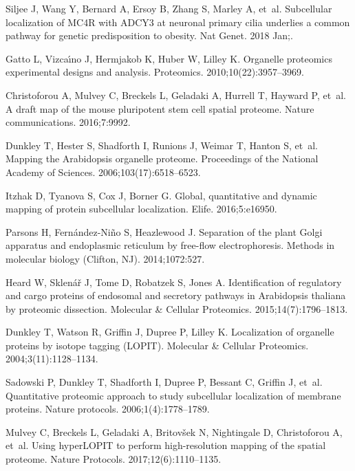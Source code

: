 \documentclass[10pt,letterpaper]{article}\usepackage[]{graphicx}\usepackage[]{color}
\begin{document}
\begin{thebibliography}{10}
Siljee J, Wang Y, Bernard A, Ersoy B, Zhang S, Marley A, et~al.
\newblock Subcellular localization of {MC4R} with {ADCY3} at neuronal primary
  cilia underlies a common pathway for genetic predisposition to obesity.
\newblock Nat Genet. 2018 Jan;.

Gatto L, Vizca{\'\i}no J, Hermjakob K, Huber W, Lilley K.
\newblock Organelle proteomics experimental designs and analysis.
\newblock Proteomics. 2010;10(22):3957--3969.

Christoforou A, Mulvey C, Breckels L, Geladaki A, Hurrell T, Hayward P, et~al.
\newblock A draft map of the mouse pluripotent stem cell spatial proteome.
\newblock Nature communications. 2016;7:9992.

Dunkley T, Hester S, Shadforth I, Runions J, Weimar T, Hanton S, et~al.
\newblock Mapping the Arabidopsis organelle proteome.
\newblock Proceedings of the National Academy of Sciences.
  2006;103(17):6518--6523.

Itzhak D, Tyanova S, Cox J, Borner G.
\newblock Global, quantitative and dynamic mapping of protein subcellular
  localization.
\newblock Elife. 2016;5:e16950.

Parsons H, Fern{\'a}ndez-Ni{\~n}o S, Heazlewood J.
\newblock Separation of the plant Golgi apparatus and endoplasmic reticulum by
  free-flow electrophoresis.
\newblock Methods in molecular biology (Clifton, NJ). 2014;1072:527.

Heard W, Sklen{\'a}{\v{r}} J, Tome D, Robatzek S, Jones A.
\newblock Identification of regulatory and cargo proteins of endosomal and
  secretory pathways in Arabidopsis thaliana by proteomic dissection.
\newblock Molecular \& Cellular Proteomics. 2015;14(7):1796--1813.

Dunkley T, Watson R, Griffin J, Dupree P, Lilley K.
\newblock Localization of organelle proteins by isotope tagging (LOPIT).
\newblock Molecular \& Cellular Proteomics. 2004;3(11):1128--1134.

Sadowski P, Dunkley T, Shadforth I, Dupree P, Bessant C, Griffin J, et~al.
\newblock Quantitative proteomic approach to study subcellular localization of
  membrane proteins.
\newblock Nature protocols. 2006;1(4):1778--1789.

Mulvey C, Breckels L, Geladaki A, Britov{\v{s}}ek N, Nightingale D,
  Christoforou A, et~al.
\newblock Using {hyperLOPIT} to perform high-resolution mapping of the spatial
  proteome.
\newblock Nature Protocols. 2017;12(6):1110--1135.


\end{thebibliography}
\end{document}
